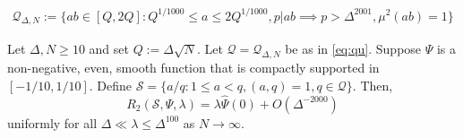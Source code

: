 \documentclass[10pt,a4paper]{amsart}
\begin{document}
    \begin{align} \label{eq:qu}
    \mathcal{Q}_{\Delta, N} := 
    \Big \{ a b \in [Q, 2Q]: Q^{1/1000} \leq a \leq 2 Q^{1/1000}, p | a b \implies p > \Delta^{2001}, \mu^2(a b) = 1 \Big \}
    \end{align}

\begin{lemma}\label{le:paircorrel}
 Let $\Delta, N \geq 10$ and set 
 $Q := \Delta \sqrt{N}$. 
  Let $\mathcal{Q}=\mathcal{Q}_{\Delta,N}$ 
  be as in \eqref{eq:qu}. Suppose $\Psi$
  is a non-negative, even, 
  smooth function that is compactly supported in 
  $[-1 / 10,1 / 10]$.
  Define $\mathcal{S}=\{a/q: 
  1\leq a < q, (a,q)=1, q\in \mathcal{Q}\}$. Then,
  \begin{equation}\label{eq:paircorrelasymp}
    R_2(\mathcal{S},\Psi,\lambda) = 
    \lambda \widehat{\Psi}(0) + O(\Delta^{-2000})  
  \end{equation}
uniformly for all $\Delta\ll \lambda \leq \Delta^{100}$ as $N \rightarrow \infty$.
\end{lemma}
\end{document}
